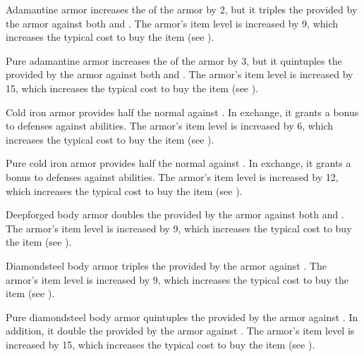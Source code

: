          Adamantine armor increases the  of the armor by 2, but it triples the  provided by the armor against both  and .
        The armor's item level is increased by 9, which increases the typical cost to buy the item (see ).

         Pure adamantine armor increases the  of the armor by 3, but it quintuples the  provided by the armor against both  and .
        The armor's item level is increased by 15, which increases the typical cost to buy the item (see ).

         Cold iron armor provides half the normal  against .
        In exchange, it grants a  bonus to defenses against  abilities.
        The armor's item level is increased by 6, which increases the typical cost to buy the item (see ).

         Pure cold iron armor provides half the normal  against .
        In exchange, it grants a  bonus to defenses against  abilities.
        The armor's item level is increased by 12, which increases the typical cost to buy the item (see ).

         Deepforged body armor doubles the  provided by the armor against both  and .
        The armor's item level is increased by 9, which increases the typical cost to buy the item (see ).

         Diamondsteel body armor triples the  provided by the armor against .
        The armor's item level is increased by 9, which increases the typical cost to buy the item (see ).

         Pure diamondsteel body armor quintuples the  provided by the armor against .
        In addition, it double the  provided by the armor against .
        The armor's item level is increased by 15, which increases the typical cost to buy the item (see ).

